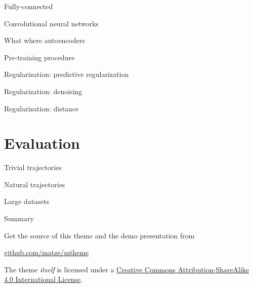 \documentclass[10pt]{beamer}
\begin{document}
\begin{frame}[fragile]{Fully-connected}
\end{frame}

\begin{frame}[fragile]{Convolutional neural networks}
\end{frame}

\begin{frame}[fragile]{What where autoencoders}
\end{frame}


\begin{frame}[fragile]{Pre-training procedure}
\end{frame}

\begin{frame}[fragile]{Regularization: predictive regularization}
\end{frame}

\begin{frame}[fragile]{Regularization: denoising}
\end{frame}

\begin{frame}[fragile]{Regularization: distance}
\end{frame}


\section{Evaluation}

\begin{frame}[fragile]{Trivial trajectories}
\end{frame}

\begin{frame}[fragile]{Natural trajectories}
\end{frame}

\begin{frame}[fragile]{Large datasets}
\end{frame}


\begin{frame}{Summary}

  Get the source of this theme and the demo presentation from

  \begin{center}\url{github.com/matze/mtheme}\end{center}

  The theme \emph{itself} is licensed under a
  \href{http://creativecommons.org/licenses/by-sa/4.0/}{Creative Commons
  Attribution-ShareAlike 4.0 International License}.

  \begin{center}\ccbysa\end{center}

\end{frame}
\end{document}
